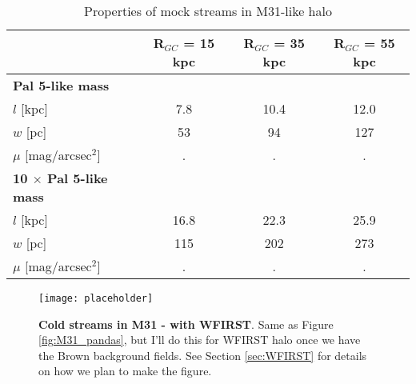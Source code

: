 \documentclass[twocolumn]{aastex62}
\newcommand{\todo}[1]{{\color{red} TODO: #1}}
\begin{document}
\begin{table*}
\centering
\caption{Properties of mock streams in M31-like halo}
\label{tab:Pal5}
\begin{tabular}{lccc}
\hline
 & {\bf R$_{GC}$ = 15 kpc }&  {\bf R$_{GC}$ = 35 kpc} &  {\bf R$_{GC}$ = 55 kpc} \\ 
 \hline
{\bf Pal 5-like mass} & &&\\
$l$ [kpc] & 7.8 & 10.4 &  12.0  \\
$w$ [pc] & 53 & 94  & 127  \\
$\mu$ [mag/arcsec$^2$] &. &.  &.  \\
\hline
{\bf 10 $\times$ Pal 5-like mass} & &&\\ 
$l$ [kpc] &16.8 & 22.3 & 25.9 \\
$w$ [pc]& 115 & 202 & 273  \\
$\mu$ [mag/arcsec$^2$] &. &.  &.  \\

\hline 
\end{tabular}
\end{table*}




\begin{figure}
\centerline{\texttt{[image: placeholder]}}
\caption{{\bf Cold streams in M31 - with WFIRST}. Same as Figure \ref{fig:M31_pandas}, but I'll do this for WFIRST halo once we have the Brown background fields. See Section \ref{sec:WFIRST} for details on how we plan to make the figure.}
\label{fig:M31_wfirst}
\end{figure}
\end{document}
